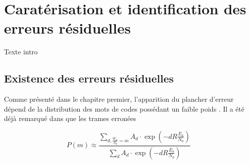 \chapter{Caratérisation et identification des erreurs résiduelles} %

Texte intro

\vspace*{\fill}
\minitocTITI
\vspace*{\fill}
\newpage

\section{Existence des erreurs résiduelles}
Comme présenté dans le chapitre premier, l'apparition du plancher d'erreur dépend de la distribution des mots de codes 
possédant un faible poids \cite{distance_spectrum}. Il a été déjà remarqué dans \cite{takeshitaBCH} que les trames 
erronées 

\begin{equation}
P(m) \approx \frac{\displaystyle\sum\limits_{d, \frac{W_d}{A_d}=m} A_d\cdot \exp\left(-d R \frac{E_b}{N_0}\right)}
                  {\displaystyle\sum\limits_{d} A_d\cdot \exp\left(-d R \frac{E_b}{N_0}\right)}
\label{eq:be}
\end{equation}